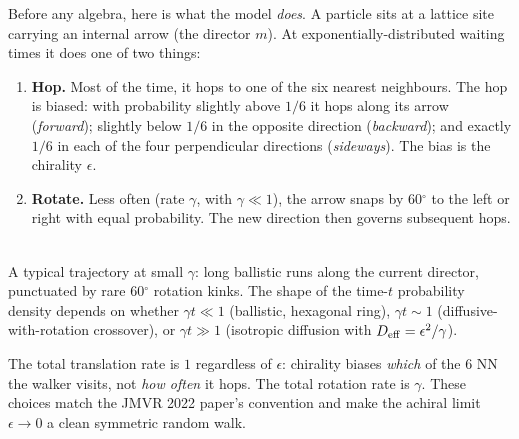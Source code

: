 \documentclass[11pt,a4paper]{article}
\begin{document}
Before any algebra, here is what the model \emph{does}. A particle sits
at a lattice site carrying an internal arrow (the director $m$). At
exponentially-distributed waiting times it does one of two things:

\begin{enumerate}[leftmargin=*]
\item \textbf{Hop.} Most of the time, it hops to one of the six nearest
  neighbours. The hop is biased: with probability slightly above $1/6$
  it hops along its arrow (\emph{forward}); slightly below $1/6$ in the
  opposite direction (\emph{backward}); and exactly $1/6$ in each of the
  four perpendicular directions (\emph{sideways}). The bias is the
  chirality $\epsilon$.
\item \textbf{Rotate.} Less often (rate $\gamma$, with $\gamma \ll 1$),
  the arrow snaps by 60$^\circ$ to the left or right with equal
  probability. The new direction then governs subsequent hops.
\end{enumerate}

\begin{center}
\\[2mm]
{\footnotesize A typical trajectory at small $\gamma$: long ballistic
runs along the current director, punctuated by rare 60$^\circ$ rotation
kinks. The shape of the time-$t$ probability density depends on whether
$\gamma t \ll 1$ (ballistic, hexagonal ring), $\gamma t \sim 1$
(diffusive-with-rotation crossover), or $\gamma t \gg 1$ (isotropic
diffusion with $D_{\rm eff} = \epsilon^2 / \gamma$).}
\end{center}

\begin{intuition}
The total translation rate is $1$ regardless of $\epsilon$: chirality
biases \emph{which} of the 6 NN the walker visits, not \emph{how often}
it hops. The total rotation rate is $\gamma$. These choices match the
JMVR 2022 paper's convention and make the achiral limit
$\epsilon \to 0$ a clean symmetric random walk.
\end{intuition}
\end{document}
